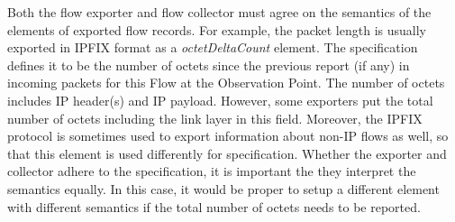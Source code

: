 Both the flow exporter and flow collector must agree on the semantics of the elements of exported flow records. For example, the packet length is usually exported in IPFIX format as a \emph{octetDeltaCount} element. The specification~\cite{IANA-2017-IP} defines it to be the number of octets since the previous report (if any) in incoming packets for this Flow at the Observation Point. The number of octets includes IP header(s) and IP payload. However, some exporters put the total number of octets including the link layer in this field. Moreover, the IPFIX protocol is sometimes used to export information about non-IP flows as well, so that this element is used differently for specification. Whether the exporter and collector adhere to the specification, it is important the they interpret the semantics equally. In this case, it would be proper to setup a different element with different semantics if the total number of octets needs to be reported.



%
